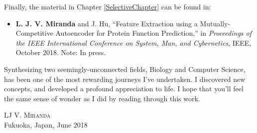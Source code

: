 \par Finally, the material in Chapter \ref{SelectiveChapter} can be found in:

\begin{itemize}
    \item \textbf{L. J. V. Miranda} and J. Hu, ``Feature Extraction using a
    Mutually-Competitive Autoencoder for Protein Function Prediction,'' in
    \textit{Proceedings of the IEEE International Conference on System, Man,
    and Cybernetics}, IEEE, October 2018. Note: In press.
\end{itemize}

Synthesizing two seemingly-unconnected fields, Biology and Computer Science,
has been one of the most rewarding journeys I've undertaken. I discovered new
concepts, and developed a profound appreciation to life. I hope that you'll
feel the same sense of wonder as I did by reading through this work.

\vspace*{4ex}
\begin{flushright}
    \textsc{LJ V. Miranda}\\
    Fukuoka, Japan, June 2018
\end{flushright}
